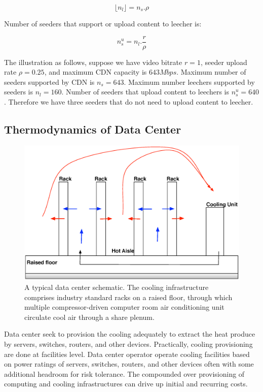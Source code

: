 \documentclass[JIP]{ipsj}
\begin{document}
\begin{equation}\label{eqn:leecher}
	\lfloor n_l \rfloor = n_s . \rho
\end{equation}

Number of seeders that support or upload content to leecher is:

\begin{equation}\label{eqn:seeders-to-leechers}
	n_{s}^{u} = n_l . \frac{r}{\rho}
\end{equation}

The illustration as follows, suppose we have video bitrate $r=1$, seeder upload rate $\rho=0.25$, and maximum CDN capacity is $643Mbps$. 
Maximum number of seeders supported by CDN is $n_s=643$.
Maximum number leechers supported by seeders is $n_l=160$.  
Number of seeders that upload content to leechers is $n_{s}^{u}=640$.  
Therefore we have three seeders that do not need to upload content to leecher. 


\subsection{Thermodynamics of Data Center}\label{thermodynamics}
\begin{figure}[thb]
\begin{center}
\includegraphics[scale=0.3]{graphs/datacenter.eps}
\end{center}
\caption{A typical data center schematic.
The cooling infrastructure comprises industry standard racks on a raised floor, through which multiple compressor-driven computer room air conditioning unit circulate cool air through a share plenum.}
\label{fig:datacenter}
\vspace{-2mm}
\end{figure} 
Data center seek to provision the cooling adequately to extract the heat produce by servers, switches, routers, and other devices.
Practically, cooling provisioning are done at facilities level.
Data center operator operate cooling facilities based on power ratings of servers, switches, routers, and other devices often with some additional headroom for risk tolerance. 
The compounded over provisioning of computing and cooling infrastructures can drive up initial and recurring costs. 
\end{document}
